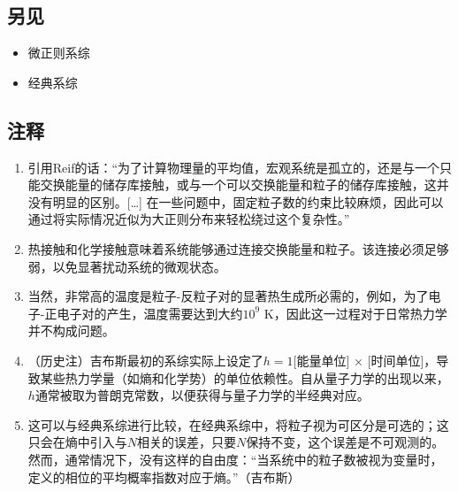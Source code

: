 \subsection{另见}  
\begin{itemize}
\item 微正则系综  
\item 经典系综
\end{itemize}  
\subsection{注释}  
\begin{enumerate}
\item 引用Reif的话：“为了计算物理量的平均值，宏观系统是孤立的，还是与一个只能交换能量的储存库接触，或与一个可以交换能量和粒子的储存库接触，这并没有明显的区别。[…] 在一些问题中，固定粒子数的约束比较麻烦，因此可以通过将实际情况近似为大正则分布来轻松绕过这个复杂性。”
\item 热接触和化学接触意味着系统能够通过连接交换能量和粒子。该连接必须足够弱，以免显著扰动系统的微观状态。
\item 当然，非常高的温度是粒子-反粒子对的显著热生成所必需的，例如，为了电子-正电子对的产生，温度需要达到大约\(10^9\) K，因此这一过程对于日常热力学并不构成问题。
\item （历史注）吉布斯最初的系综实际上设定了\( h = 1 \)[能量单位] × [时间单位]，导致某些热力学量（如熵和化学势）的单位依赖性。自从量子力学的出现以来，\( h \)通常被取为普朗克常数，以便获得与量子力学的半经典对应。
\item 这可以与经典系综进行比较，在经典系综中，将粒子视为可区分是可选的；这只会在熵中引入与\( N \)相关的误差，只要\( N \)保持不变，这个误差是不可观测的。然而，通常情况下，没有这样的自由度：“当系统中的粒子数被视为变量时，定义的相位的平均概率指数对应于熵。”（吉布斯）
\end{enumerate}